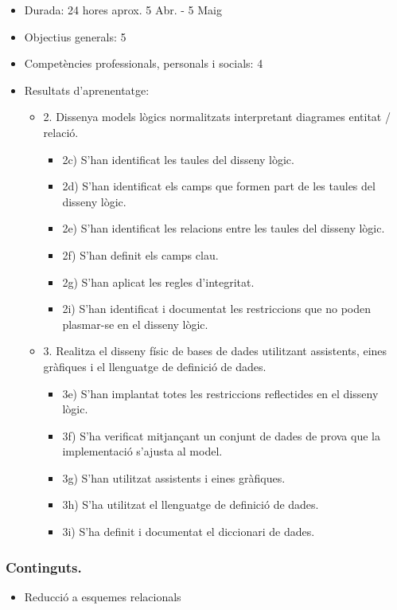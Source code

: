 \documentclass[catalan, a4paper, 12pt, titlepage]{article}
\begin{document}
  \begin{itemize}
	\item Durada: 24 hores aprox. 5 Abr. - 5 Maig
	\item Objectius generals: 5
	\item Competències professionals, personals i socials: 4
	\item Resultats d'aprenentatge: 
		\begin{itemize}
			\item 2. Dissenya models lògics normalitzats interpretant diagrames entitat / relació.
				\begin{itemize}
					\item 2c) S'han identificat les taules del disseny lògic.
					\item 2d) S'han identificat els camps que formen part de les taules del disseny lògic.
					\item 2e) S'han identificat les relacions entre les taules del disseny lògic.
					\item 2f) S'han definit els camps clau.
					\item 2g) S'han aplicat les regles d'integritat.
					\item 2i) S'han identificat i documentat les restriccions que no poden plasmar-se en el disseny lògic.
				\end{itemize}
			\item 3. Realitza el disseny físic de bases de dades utilitzant assistents, eines gràfiques i el llenguatge de definició de dades.
				\begin{itemize}
					\item 3e) S'han implantat totes les restriccions reflectides en el disseny lògic.
					\item 3f) S'ha verificat mitjançant un conjunt de dades de prova que la implementació s'ajusta al model.
					\item 3g) S'han utilitzat assistents i eines gràfiques.
					\item 3h) S'ha utilitzat el llenguatge de definició de dades.
					\item 3i) S'ha definit i documentat el diccionari de dades.
				\end{itemize}
		\end{itemize}
  \end{itemize}

  \subsubsection{Continguts.}
  \begin{itemize}
	\item Reducció a esquemes relacionals
  \end{itemize}
\end{document}
